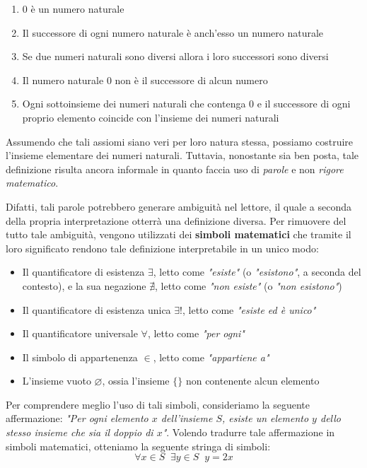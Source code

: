 \documentclass[a4paper, 12pt]{report}
\begin{document}
    \begin{enumerate}
        \item $0$ è un numero naturale
        \item Il successore di ogni numero naturale è anch'esso un numero naturale
        \item Se due numeri naturali sono diversi allora i loro successori sono diversi
        \item Il numero naturale $0$ non è il successore di alcun numero
        \item Ogni sottoinsieme dei numeri naturali che contenga $0$ e il successore di ogni proprio elemento coincide con l'insieme dei numeri naturali
    \end{enumerate}

    Assumendo che tali assiomi siano veri per loro natura stessa, possiamo costruire l'insieme elementare dei numeri naturali. Tuttavia, nonostante sia ben posta, tale definizione risulta  ancora informale in quanto faccia uso di \textit{parole} e non \textit{rigore matematico}.
    
    Difatti, tali parole potrebbero generare ambiguità nel lettore, il quale a seconda della propria interpretazione otterrà una definizione diversa. Per rimuovere del tutto tale ambiguità, vengono utilizzati dei \textbf{simboli matematici} che tramite il loro significato rendono tale definizione interpretabile in un unico modo:

    \begin{itemize}
        \item Il quantificatore di esistenza $\exists$, letto come \textit{"esiste"} (o \textit{"esistono"}, a seconda del contesto), e la sua negazione $\nexists$, letto come \textit{"non esiste"} (o \textit{"non esistono"})
        \item Il quantificatore di esistenza unica $\exists!$, letto come \textit{"esiste ed è unico"}
        \item Il quantificatore universale $\forall$, letto come \textit{"per ogni"}
        \item Il simbolo di appartenenza $\in$, letto come \textit{"appartiene a"}
        \item L'insieme vuoto $\varnothing$, ossia l'insieme $\{\}$ non contenente alcun elemento
    \end{itemize}

    Per comprendere meglio l'uso di tali simboli, consideriamo la seguente affermazione: \textit{"Per ogni elemento $x$ dell'insieme $S$, esiste un elemento $y$ dello stesso insieme che sia il doppio di $x$"}. Volendo tradurre tale affermazione in simboli matematici, otteniamo la seguente stringa di simboli:
    \[\forall x \in S \;\; \exists y \in S \;\; y = 2x\]
\end{document}

